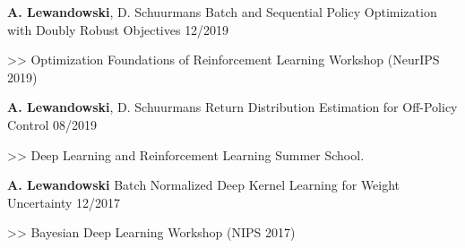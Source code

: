 \begin{cventries}
    \cventry
    { \textbf{A. Lewandowski}, D. Schuurmans}
    {Batch and Sequential Policy Optimization with Doubly Robust Objectives}
    {12/2019}
    {
      \begin{cvitems}
    	\item[>>] Optimization Foundations of Reinforcement Learning Workshop (NeurIPS 2019)
      \end{cvitems}
    }

    \cventry
    { \textbf{A. Lewandowski}, D. Schuurmans}
    {Return Distribution Estimation for Off-Policy Control}
    {08/2019}
    {
      \begin{cvitems}
    	\item[>>] Deep Learning and Reinforcement Learning Summer School.
      \end{cvitems}
    }

  \cventry
    {\textbf{A. Lewandowski}}
    {Batch Normalized Deep Kernel Learning for Weight Uncertainty}
    {12/2017}
    {
      \begin{cvitems}
    	\item[>>] Bayesian Deep Learning Workshop (NIPS 2017)
      \end{cvitems}
    }
  \end{cventries}

% 
% 

